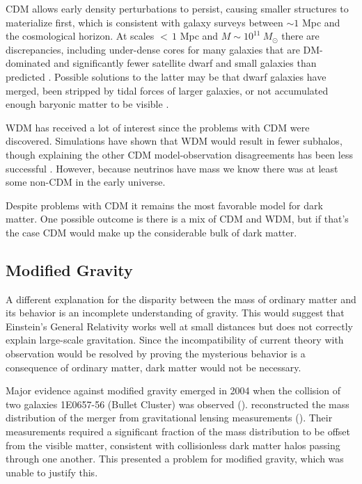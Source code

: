 CDM allows early density perturbations to persist, causing smaller structures to materialize first, which is
consistent with galaxy surveys between ${\sim} 1$ Mpc and the cosmological horizon.  At scales ${<}\, 1$ Mpc and
$M \sim 10^{11} \ M_{\odot}$ there are discrepancies, including under-dense cores for many galaxies that are DM-dominated
and significantly fewer satellite dwarf and small galaxies than predicted .  Possible
solutions to the latter may be that dwarf galaxies have merged, been stripped by tidal forces of larger galaxies, or
not accumulated enough baryonic matter to be visible .

WDM has received a lot of interest since the problems with CDM were discovered.  Simulations have shown that
WDM would result in fewer subhalos, though explaining the other CDM model-observation disagreements has been less
successful .  However, because neutrinos have mass we know there
was at least some non-CDM in the early universe.

Despite problems with CDM it remains the most favorable model for dark matter.  One possible outcome is
there is a mix of CDM and WDM, but if that's the case CDM would make up the considerable bulk of dark matter.



\subsection{Modified Gravity}
\label{subsec:modified_gravity}
A different explanation for the disparity between the mass of ordinary matter and its behavior is an incomplete understanding of
gravity.  This
would suggest that Einstein's General Relativity works well at small distances but does not correctly explain large-scale
gravitation.  Since the incompatibility of current theory with observation would be resolved by proving the mysterious behavior is
a consequence of ordinary matter, dark matter would not be necessary.

Major evidence against modified gravity emerged in 2004 when the collision of two galaxies 1E0657-56 (Bullet Cluster) was observed
().   reconstructed the mass distribution of the merger from gravitational
lensing measurements ().  Their measurements required a significant fraction of the mass
distribution to be offset from the visible matter, consistent with collisionless dark matter halos passing through one another.  This
presented a problem for modified gravity, which was unable to justify this.

